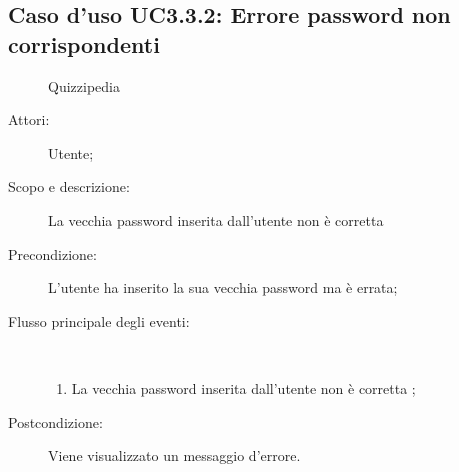 \subsection{Caso d'uso UC3.3.2: Errore password non corrispondenti}
	\begin{figure}[H]
		\centering
		\begin{resizedtikzpicture}{\textwidth}
		\begin{umlsystem}[x=0, fill=lightgray!20]{Quizzipedia}
		\end{umlsystem}
		\end{resizedtikzpicture}
		\caption{}
	\end{figure}
\begin{description}
\item[Attori:] Utente;
\item[Scopo e descrizione:] La vecchia password inserita dall'utente non è corretta
      \item[Precondizione:] L'utente ha inserito la sua vecchia password ma è errata;

        \item[Flusso principale degli eventi:] \ 
 \begin{enumerate}
          \item La vecchia password inserita dall'utente non è corretta
;

      \end{enumerate}
    \item[Postcondizione:] Viene visualizzato un messaggio d'errore.
  \end{description}
\hypertarget{UC3.4}{}
